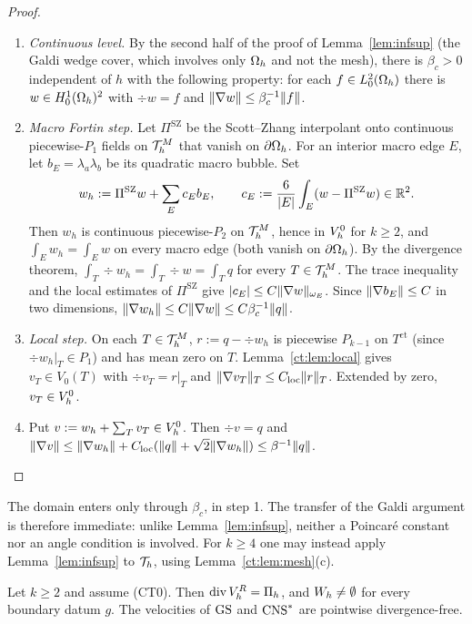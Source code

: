 \begin{proof}
\begin{enumerate}
\item \emph{Continuous level.} By the second half of the proof of Lemma~\ref{lem:infsup} (the Galdi wedge cover, which involves only $\Omega_h$ and not the mesh), there is $\beta_c>0$ independent of $h$ with the following property: for each $f\in L^2_0(\Omega_h)$ there is $w\in H^1_0(\Omega_h)^2$ with $\div w=f$ and $\lVert \nabla w\rVert\le\beta_c^{-1}\lVert f\rVert$.
\item \emph{Macro Fortin step.} Let $\Pi^{\mathrm{SZ}}$ be the Scott--Zhang interpolant \cite{ScottZhang1990} onto continuous piecewise-$P_1$ fields on $\mathcal T_h^M$ that vanish on $\partial\Omega_h$. For an interior macro edge $E$, let $b_E=\lambda_a\lambda_b$ be its quadratic macro bubble. Set
\[
w_h:=\Pi^{\mathrm{SZ}}w+\sum_{E}c_Eb_E,\qquad c_E:=\frac{6}{|E|}\int_E(w-\Pi^{\mathrm{SZ}}w)\in\mathbb R^2 .
\]
Then $w_h$ is continuous piecewise-$P_2$ on $\mathcal T_h^M$, hence in $V_h^0$ for $k\ge2$, and $\int_Ew_h=\int_Ew$ on every macro edge (both vanish on $\partial\Omega_h$). By the divergence theorem, $\int_T\div w_h=\int_T\div w=\int_Tq$ for every $T\in\mathcal T_h^M$. The trace inequality and the local estimates of $\Pi^{\mathrm{SZ}}$ give $|c_E|\le C\lVert \nabla w\rVert_{\omega_E}$. Since $\lVert \nabla b_E\rVert\le C$ in two dimensions, $\lVert \nabla w_h\rVert\le C\lVert \nabla w\rVert\le C\beta_c^{-1}\lVert q\rVert$.
\item \emph{Local step.} On each $T\in\mathcal T_h^M$, $r:=q-\div w_h$ is piecewise $P_{k-1}$ on $T^{\mathrm{ct}}$ (since $\div w_h|_T\in P_1$) and has mean zero on $T$. Lemma~\ref{ct:lem:local} gives $v_T\in V_0(T)$ with $\div v_T=r|_T$ and $\lVert \nabla v_T\rVert_T\le C_{\mathrm{loc}}\lVert r\rVert_T$. Extended by zero, $v_T\in V_h^0$.
\item Put $v:=w_h+\sum_Tv_T\in V_h^0$. Then $\div v=q$ and $\lVert \nabla v\rVert\le\lVert \nabla w_h\rVert+C_{\mathrm{loc}}(\lVert q\rVert+\sqrt2\lVert \nabla w_h\rVert)\le\beta^{-1}\lVert q\rVert$.\qedhere
\end{enumerate}
\end{proof}

The domain enters only through $\beta_c$, in step 1. The transfer of the Galdi argument is therefore immediate: unlike Lemma~\ref{lem:infsup}, neither a Poincar\'e constant nor an angle condition is involved. For $k\ge4$ one may instead apply Lemma~\ref{lem:infsup} to $\mathcal T_h$, using Lemma~\ref{ct:lem:mesh}(c).

\begin{lemma}\label{ct:lem:divrange}
Let $k\ge2$ and assume (CT0). Then $\operatorname{div}V_h^R=\Pi_h$, and $W_h\ne\emptyset$ for every boundary datum $g$. The velocities of $\mathrm{GS}$ and $\mathrm{CNS}^\ast$ are pointwise divergence-free.
\end{lemma}

